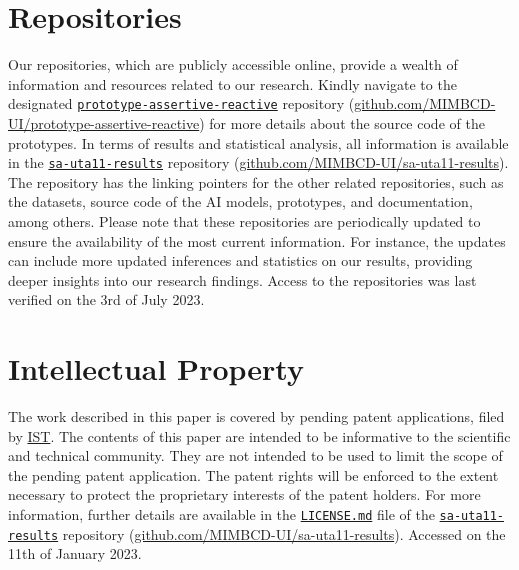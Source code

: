 \section{Repositories}
\label{sec:app005016}

Our repositories, which are publicly accessible online, provide a wealth of information and resources related to our research.
Kindly navigate to the designated \texttt{\href{https://github.com/MIMBCD-UI/prototype-assertive-reactive}{prototype-assertive-reactive}} repository (\href{https://github.com/MIMBCD-UI/prototype-assertive-reactive}{github.com/MIMBCD-UI/prototype-assertive-reactive}) for more details about the source code of the prototypes.
In terms of results and statistical analysis, all information is available in the \texttt{\href{https://github.com/MIMBCD-UI/sa-uta11-results}{sa-uta11-results}} repository (\href{https://github.com/MIMBCD-UI/sa-uta11-results}{github.com/MIMBCD-UI/sa-uta11-results}).
The repository has the linking pointers for the other related repositories, such as the datasets, source code of the \ac{AI} models, prototypes, and documentation, among others.
Please note that these repositories are periodically updated to ensure the availability of the most current information.
For instance, the updates can include more updated inferences and statistics on our results, providing deeper insights into our research findings.
Access to the repositories was last verified on the 3rd of July 2023.

\section{Intellectual Property}
\label{sec:app005017}

The work described in this paper is covered by pending patent applications, filed by \href{https://tecnico.ulisboa.pt}{\acl{IST}}.
The contents of this paper are intended to be informative to the scientific and technical community.
They are not intended to be used to limit the scope of the pending patent application.
The patent rights will be enforced to the extent necessary to protect the proprietary interests of the patent holders.
For more information, further details are available in the \texttt{\href{https://github.com/MIMBCD-UI/sa-uta11-results/blob/main/LICENSE.md}{LICENSE.md}} file of the \texttt{\href{https://github.com/MIMBCD-UI/sa-uta11-results}{sa-uta11-results}} repository (\href{https://github.com/MIMBCD-UI/sa-uta11-results}{github.com/MIMBCD-UI/sa-uta11-results}).
Accessed on the 11th of January 2023.

